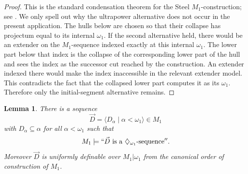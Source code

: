 \documentclass[a4paper,11pt]{article}
\newtheorem{lemma}[theorem]{Lemma}
\begin{document}
\begin{proof}
This is the standard condensation theorem for the Steel $M_1$-construction; see \cite[Theorem~5.1]{Steel3}.  We only spell out why the ultrapower alternative does not occur in the present application.  The hulls below are chosen so that their collapse has projectum equal to its internal $\omega_1$.  If the second alternative held, there would be an extender on the $M_1$-sequence indexed exactly at this internal $\omega_1$.  The lower part below that index is the collapse of the corresponding lower part of the hull and sees the index as the successor cut reached by the construction.  An extender indexed there would make the index inaccessible in the relevant extender model.  This contradicts the fact that the collapsed lower part computes it as its $\omega_1$.  Therefore only the initial-segment alternative remains.
\end{proof}

\begin{lemma}\label{lem:m1-diamond}
There is a sequence
\[
   \vec D=\langle D_\alpha\mid \alpha<\omega_1\rangle\in M_1
\]
with $D_\alpha\subseteq\alpha$ for all $\alpha<\omega_1$ such that
\[
   M_1\models ``\vec D\text{ is a }\diamondsuit_{\omega_1}\text{-sequence}''.
\]
Moreover $\vec D$ is uniformly definable over $M_1|\omega_1$ from the canonical order of construction of $M_1$.
\end{lemma}
\end{document}
